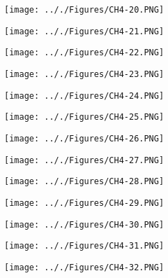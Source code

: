 \documentclass[onecolumn,11pt]{report}
\def\lthtmlcheckvsize{\ifdim\ht\sizebox<\vsize 
  \ifdim\wd\sizebox<\hsize\expandafter\hfill\fi \expandafter\vfill
  \else\expandafter\vss\fi}%
\begin{document}
{\newpage\clearpage
{}%
\texttt{[image: .././Figures/CH4-20.PNG]}%
\lthtmlpictureZ
\lthtmlcheckvsize\clearpage}

{\newpage\clearpage
{}%
\texttt{[image: .././Figures/CH4-21.PNG]}%
\lthtmlpictureZ
\lthtmlcheckvsize\clearpage}

{\newpage\clearpage
{}%
\texttt{[image: .././Figures/CH4-22.PNG]}%
\lthtmlpictureZ
\lthtmlcheckvsize\clearpage}

{\newpage\clearpage
{}%
\texttt{[image: .././Figures/CH4-23.PNG]}%
\lthtmlpictureZ
\lthtmlcheckvsize\clearpage}

{\newpage\clearpage
{}%
\texttt{[image: .././Figures/CH4-24.PNG]}%
\lthtmlpictureZ
\lthtmlcheckvsize\clearpage}

{\newpage\clearpage
{}%
\texttt{[image: .././Figures/CH4-25.PNG]}%
\lthtmlpictureZ
\lthtmlcheckvsize\clearpage}

{\newpage\clearpage
{}%
\texttt{[image: .././Figures/CH4-26.PNG]}%
\lthtmlpictureZ
\lthtmlcheckvsize\clearpage}

{\newpage\clearpage
{}%
\texttt{[image: .././Figures/CH4-27.PNG]}%
\lthtmlpictureZ
\lthtmlcheckvsize\clearpage}

{\newpage\clearpage
{}%
\texttt{[image: .././Figures/CH4-28.PNG]}%
\lthtmlpictureZ
\lthtmlcheckvsize\clearpage}

{\newpage\clearpage
{}%
\texttt{[image: .././Figures/CH4-29.PNG]}%
\lthtmlpictureZ
\lthtmlcheckvsize\clearpage}

{\newpage\clearpage
{}%
\texttt{[image: .././Figures/CH4-30.PNG]}%
\lthtmlpictureZ
\lthtmlcheckvsize\clearpage}

{\newpage\clearpage
{}%
\texttt{[image: .././Figures/CH4-31.PNG]}%
\lthtmlpictureZ
\lthtmlcheckvsize\clearpage}

{\newpage\clearpage
{}%
\texttt{[image: .././Figures/CH4-32.PNG]}%
\lthtmlpictureZ
\lthtmlcheckvsize\clearpage}
\end{document}
